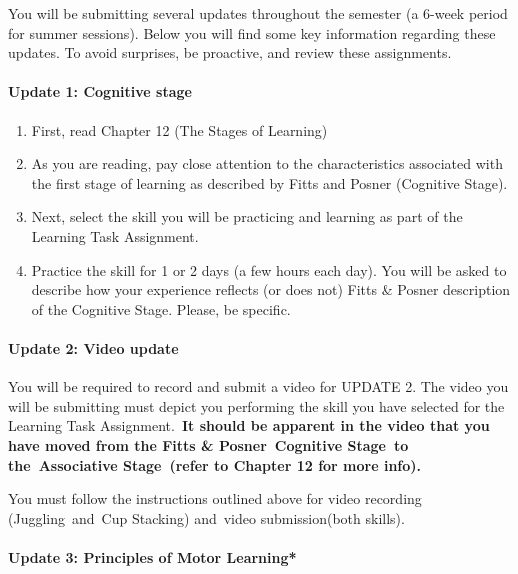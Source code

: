 \documentclass[
  letterpaper,
  DIV=11,
  numbers=noendperiod]{scrartcl}
\let\oldparagraph\paragraph
\renewcommand{\paragraph}[1]{\oldparagraph{#1}\mbox{}}
\providecommand{\tightlist}{%
  \setlength{\itemsep}{0pt}\setlength{\parskip}{0pt}}\usepackage{longtable,booktabs,array}
\begin{document}
You will be submitting several updates throughout the semester (a 6-week
period for summer sessions). Below you will find some key information
regarding these updates. To avoid surprises, be proactive, and review
these assignments.

\hypertarget{update-1-cognitive-stage}{%
\paragraph{Update 1: Cognitive stage}\label{update-1-cognitive-stage}}

\begin{enumerate}
\def\labelenumi{\arabic{enumi}.}
\tightlist
\item
  First, read Chapter 12 (The Stages of Learning)
\item
  As you are reading, pay close attention to the characteristics
  associated with the first stage of learning as described by Fitts and
  Posner (Cognitive Stage).
\item
  Next, select the skill you will be practicing and learning as part of
  the Learning Task Assignment.~
\item
  Practice the skill for 1 or 2 days (a few hours each day). You will be
  asked to describe how your experience reflects (or does not) Fitts \&
  Posner description of the Cognitive Stage. Please, be specific.~
\end{enumerate}

\hypertarget{update-2-video-update}{%
\paragraph{Update 2: Video update}\label{update-2-video-update}}

You will be required to record and submit a video for UPDATE 2. The
video you will be submitting must depict you performing the skill you
have selected for the Learning Task Assignment.~\textbf{It should be
apparent in the video that you have moved from the Fitts \&
Posner~Cognitive Stage~to the~Associative Stage~(refer to Chapter 12 for
more info).}

You must follow the instructions outlined above for video recording
(Juggling~and~Cup Stacking) and~video submission(both skills).

\hypertarget{update-3-principles-of-motor-learning}{%
\paragraph{Update 3: Principles of Motor
Learning*}\label{update-3-principles-of-motor-learning}}
\end{document}
